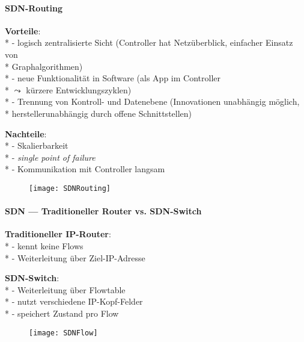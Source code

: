 \paragraph{SDN-Routing}
\begin{items}
  \item \textbf{Vorteile}: \\*
    - logisch zentralisierte Sicht (Controller hat Netzüberblick, einfacher Einsatz von \\* \phantom{-} \phantom{\( \cdot \)} Graphalgorithmen) \\*
    - neue Funktionalität in Software (als App im Controller \\* \phantom{-} \phantom{\( \cdot \)} \( \leadsto \) kürzere Entwicklungszyklen) \\*
    - Trennung von Kontroll- und Datenebene (Innovationen unabhängig möglich, \\* \phantom{-} \phantom{\( \cdot \)} herstellerunabhängig durch offene Schnittstellen)
  \item \textbf{Nachteile}: \\*
    - Skalierbarkeit \\*
    - \emph{single point of failure} \\*
    - Kommunikation mit Controller langsam
\end{items}
\begin{figure}[H]\centering\label{SDNRouting}\texttt{[image: SDNRouting]}\end{figure}

\newpage

\paragraph{SDN --- Traditioneller Router vs. SDN-Switch}
\begin{items}
  \item \textbf{Traditioneller IP-Router}: \\*
    - kennt keine Flows \\*
    - Weiterleitung über Ziel-IP-Adresse
  \item \textbf{SDN-Switch}: \\*
    - Weiterleitung über Flowtable \\*
    - nutzt verschiedene IP-Kopf-Felder \\*
    - speichert Zustand pro Flow
\end{items}
\begin{figure}[H]\centering\label{SDNFlow}\texttt{[image: SDNFlow]}\end{figure}